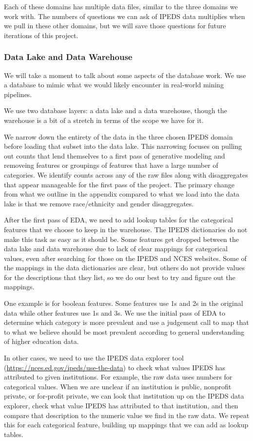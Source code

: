 \documentclass[sigconf, authorversion, nonacm]{acmart}
\begin{document}
        Each of these domains has multiple data files, similar to the three domains we work with. The numbers of questions we can ask of IPEDS data multiplies when we pull in these other domains, but we will save those questions for future iterations of this project.

    \subsubsection{Data Lake and Data Warehouse}
        We will take a moment to talk about some aspects of the database work. We use a database to mimic what we would likely encounter in real-world mining pipelines.

        We use two database layers: a data lake and a data warehouse, though the warehouse is a bit of a stretch in terms of the scope we have for it.

        We narrow down the entirety of the data in the three chosen IPEDS domain before loading that subset into the data lake. This narrowing focuses on pulling out counts that lend themselves to a first pass of generative modeling and removeing features or groupings of features that have a large number of categories. We identify counts across any of the raw files along with disaggregates that appear manageable for the first pass of the project. The primary change from what we outline in the appendix compared to what we load into the data lake is that we remove race/ethnicity and gender disaggregates.

        After the first pass of EDA, we need to add lookup tables for the categorical features that we choose to keep in the warehouse. The IPEDS dictionaries do not make this task as easy as it should be. Some features get dropped between the data lake and data warehouse due to lack of clear mappings for categorical values, even after searching for those on the IPEDS and NCES websites. Some of the mappings in the data dictionaries are clear, but others do not provide values for the descriptions that they list, so we do our best to try and figure out the mappings.

        One example is for boolean features. Some features use 1s and 2s in the original data while other features use 1s and 3s. We use the initial pass of EDA to determine which category is more prevalent and use a judgement call to map that to what we believe should be most prevalent according to general understanding of higher education data.

        In other cases, we need to use the IPEDS data explorer tool (\href{https://nces.ed.gov/ipeds/use-the-data}{https://nces.ed.gov/ipeds/use-the-data}) to check what values IPEDS has attributed to given institutions. For example, the raw data uses numbers for categorical values. When we are unclear if an institution is public, nonprofit private, or for-profit private, we can look that institution up on the IPEDS data explorer, check what value IPEDS has attributed to that institution, and then compare that description to the numeric value we find in the raw data. We repeat this for each categorical feature, building up mappings that we can add as lookup tables.
\end{document}
